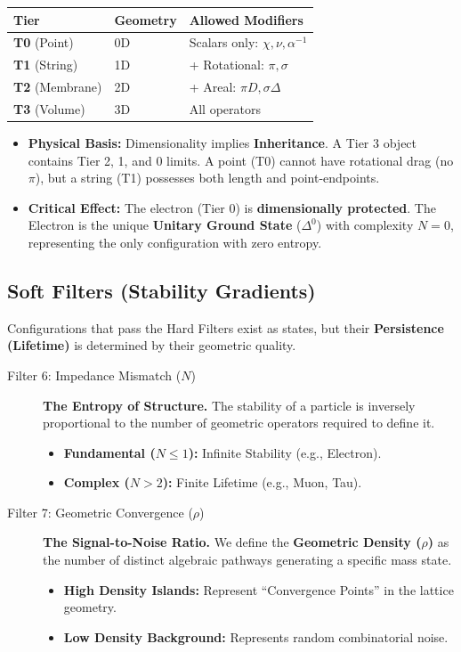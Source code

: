\begin{table}[h]
\centering
\begin{tabular}{lll}
\toprule
\textbf{Tier} & \textbf{Geometry} & \textbf{Allowed Modifiers} \\ \midrule
\textbf{T0} (Point) & 0D & Scalars only: $\chi, \nu, \alpha^{-1}$ \\
\textbf{T1} (String) & 1D & + Rotational: $\pi, \sigma$ \\
\textbf{T2} (Membrane) & 2D & + Areal: $\pi D, \sigma \Delta$ \\
\textbf{T3} (Volume) & 3D & All operators \\ \bottomrule
\end{tabular}
\end{table}

\begin{itemize}
    \item \textbf{Physical Basis:} Dimensionality implies \textbf{Inheritance}. A Tier 3 object contains Tier 2, 1, and 0 limits. A point (T0) cannot have rotational drag (no $\pi$), but a string (T1) possesses both length and point-endpoints.
    \item \textbf{Critical Effect:} The electron (Tier 0) is \textbf{dimensionally protected}. The Electron is the unique \textbf{Unitary Ground State} ($\Delta^0$) with complexity $N=0$, representing the only configuration with zero entropy.
\end{itemize}

\subsection*{Soft Filters (Stability Gradients)}

Configurations that pass the Hard Filters exist as states, but their \textbf{Persistence (Lifetime)} is determined by their geometric quality.

\begin{description}
    \item[Filter 6: Impedance Mismatch ($N$)] \textbf{The Entropy of Structure.} The stability of a particle is inversely proportional to the number of geometric operators required to define it.
    \begin{itemize}
        \item \textbf{Fundamental ($N \le 1$):} Infinite Stability (e.g., Electron).
        \item \textbf{Complex ($N > 2$):} Finite Lifetime (e.g., Muon, Tau).
    \end{itemize}

    \item[Filter 7: Geometric Convergence ($\rho$)] \textbf{The Signal-to-Noise Ratio.} We define the \textbf{Geometric Density ($\rho$)} as the number of distinct algebraic pathways generating a specific mass state.
    \begin{itemize}
        \item \textbf{High Density Islands:} Represent ``Convergence Points'' in the lattice geometry.
        \item \textbf{Low Density Background:} Represents random combinatorial noise.
    \end{itemize}
\end{description}